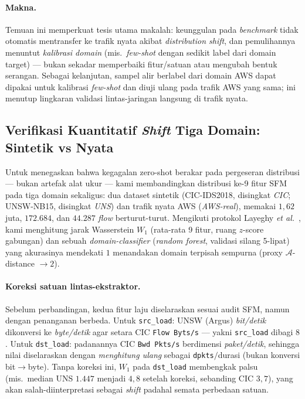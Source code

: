 \documentclass[11pt,a4paper]{article}
\begin{document}
\paragraph{Makna.} Temuan ini memperkuat tesis utama makalah: keunggulan pada
\emph{benchmark} tidak otomatis mentransfer ke trafik nyata akibat
\emph{distribution shift}, dan pemulihannya menuntut \emph{kalibrasi domain}
(mis.\ \emph{few-shot} dengan sedikit label dari domain target) --- bukan sekadar
memperbaiki fitur/satuan atau mengubah bentuk serangan. Sebagai kelanjutan, sampel
alir berlabel dari domain AWS dapat dipakai untuk kalibrasi \emph{few-shot} dan
diuji ulang pada trafik AWS yang sama; ini menutup lingkaran validasi lintas-jaringan
langsung di trafik nyata.

\subsection{Verifikasi Kuantitatif \emph{Shift} Tiga Domain: Sintetik vs Nyata}
\label{sec:rt-shift}

Untuk menegaskan bahwa kegagalan zero-shot berakar pada pergeseran distribusi ---
bukan artefak alat ukur --- kami membandingkan distribusi ke-9 fitur SFM pada tiga
domain sekaligus: dua dataset sintetik (CIC-IDS2018, disingkat \emph{CIC};
UNSW-NB15, disingkat \emph{UNS}) dan trafik nyata AWS (\emph{AWS-real}), memakai
$1{,}62$ juta, $172{.}684$, dan $44{.}287$ \emph{flow} berturut-turut. Mengikuti
protokol Layeghy \emph{et al.}~\cite{layeghy}, kami menghitung jarak Wasserstein
$W_1$ (rata-rata 9 fitur, ruang $z$-score gabungan) dan sebuah
\emph{domain-classifier} (\emph{random forest}, validasi silang 5-lipat) yang
akurasinya mendekati $1$ menandakan domain terpisah sempurna (proxy
$\mathcal{A}$-distance $\to 2$).

\paragraph{Koreksi satuan lintas-ekstraktor.} Sebelum perbandingan, kedua fitur
laju diselaraskan sesuai audit SFM, namun dengan penanganan berbeda. Untuk
\texttt{src\_load}: UNSW (Argus) \emph{bit/detik} dikonversi ke \emph{byte/detik}
agar setara CIC \texttt{Flow Byts/s} --- yakni \texttt{src\_load} dibagi $8$. Untuk
\texttt{dst\_load}: padanannya CIC \texttt{Bwd Pkts/s} berdimensi \emph{paket/detik},
sehingga nilai diselaraskan dengan \emph{menghitung ulang} sebagai
\texttt{dpkts}$/$durasi (bukan konversi bit$\rightarrow$byte). Tanpa koreksi ini,
$W_1$ pada \texttt{dst\_load} membengkak palsu (mis.\ median UNS $1{.}447$ menjadi
$4{,}8$ setelah koreksi, sebanding CIC $3{,}7$), yang akan salah-diinterpretasi
sebagai \emph{shift} padahal semata perbedaan satuan.
\end{document}
